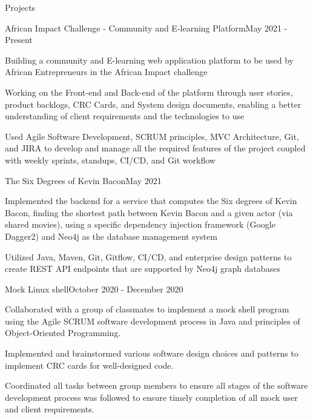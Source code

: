 \documentclass[10pt]{resume}
\begin{document}
\begin{rSection}{Projects}

\begin{rSubsection}{African Impact Challenge - Community and E-learning Platform}{May 2021 - Present}{}{}
\item Building a community and E-learning web application platform to be used by African Entrepreneurs in the African Impact challenge
\item Working on the Front-end and Back-end of the platform through user stories, product backlogs, CRC Cards, and System design documents, enabling a better understanding of client requirements and the technologies to use
\item Used Agile Software Development, SCRUM principles, MVC Architecture, Git, and JIRA to develop and manage all the required features of the project coupled with weekly sprints, standups, CI/CD, and Git workflow
\end{rSubsection}

\begin{rSubsection}{The Six Degrees of Kevin Bacon}{May 2021}{}{}
\item Implemented the backend for a service that computes the Six degrees of Kevin Bacon, finding the shortest path between Kevin Bacon and a given actor (via shared movies), using a specific dependency injection framework (Google Dagger2) and Neo4j as the database management system
\item Utilized Java, Maven, Git, Gitflow, CI/CD, and enterprise design patterns to create REST API endpoints that are supported by Neo4j graph databases
\end{rSubsection}

\begin{rSubsection}{Mock Linux shell}{October 2020 - December 2020}{}{}
\item Collaborated with a group of classmates to implement a mock shell program using the Agile SCRUM software development process in Java and principles of Object-Oriented Programming.
\item Implemented and brainstormed various software design choices and patterns to implement CRC cards for well-designed code.
\item Coordinated all tasks between group members to ensure all stages of the software development process was followed to ensure timely completion of all mock user and client requirements.
\end{rSubsection}

\end{rSection}
\end{document}
